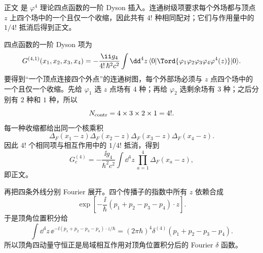 \begin{derivation}[四点树级函数的收缩与组合因子]

正文 是 $\varphi^4$ 理论四点函数的一阶 Dyson 插入。连通树级项要求每个外场都与顶点 $z$ 上四个场中的一个且仅一个收缩，因此共有 $4!$ 种相同配对；它们与作用量中的 $1/4!$ 抵消后得到正文。



四点函数的一阶 Dyson 项为
\begin{equation*}
 G^{(4,1)}(x_1,x_2,x_3,x_4)
 =-\frac{\ii g_4}{4!\,\hbar^2c^2}
 \int\dd^4 z\,
 \langle0|\Tord\{\varphi_1\varphi_2\varphi_3\varphi_4\varphi^4(z)\}|0\rangle .
\end{equation*}
要得到“一个顶点连接四个外点”的连通树图，每个外部场必须与 $z$ 点四个场中的一个且仅一个收缩。先给 $\varphi_1$ 选 $z$ 点场有 $4$ 种；再给 $\varphi_2$ 选剩余场有 $3$ 种；之后分别有 $2$ 种和 $1$ 种，所以
\begin{equation*}
 N_{\rm contr}=4\times3\times2\times1=4!.
\end{equation*}
每一种收缩都给出同一个核乘积
\begin{equation*}
 \Delta_F(x_1-z)\Delta_F(x_2-z)\Delta_F(x_3-z)\Delta_F(x_4-z).
\end{equation*}
因此 $4!$ 个相同项与相互作用中的 $1/4!$ 抵消，得到
\begin{equation*}
 G_c^{(4)}
 =-\frac{\ii g_4}{\hbar^2c^2}
 \int\dd^4 z\,\prod_{a=1}^4\Delta_F(x_a-z),
\end{equation*}
即正文。

再把四条外线分别 Fourier 展开。四个传播子的指数中所有 $z$ 依赖合成
\begin{equation*}
 \exp\!\left[-\frac{\ii}{\hbar}
 (p_1+p_2-p_3-p_4)\cdot z\right].
\end{equation*}
于是顶角位置积分给
\begin{equation*}
 \int\dd^4 z\,
 \ee^{-\ii(p_1+p_2-p_3-p_4)\cdot z/\hbar}
 =(2\pi\hbar)^4\delta^{(4)}(p_1+p_2-p_3-p_4).
\end{equation*}
所以顶角四动量守恒正是局域相互作用对顶角位置积分后的 Fourier $\delta$ 函数。
\end{derivation}


